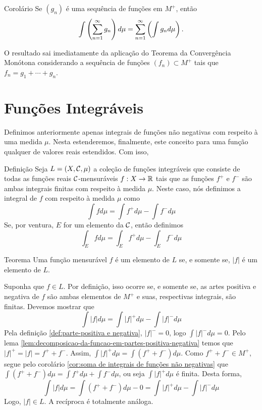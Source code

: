 \begin{env}{Corolário}
	Se $(g_n)$ é uma sequência de funções em $M^+$, então 
	$$
	\int \left(\displaystyle \sum_{n = 1} ^\infty g_n\right)d\mu
	=
	\displaystyle \sum_{n = 1} ^\infty \left(\int g_n d\mu\right).
	$$
\end{env}
\begin{prova}
	O resultado sai imediatamente da aplicação do Teorema da Convergência Monótona considerando a sequência de funções $(f_n) \subset M^+$ tais que
	$f_n = g_1 + \cdots + g_n  $.
\end{prova}
\section{Funções Integráveis}
Definimos anteriormente apenas integrais de funções não negativas com respeito à uma medida $\mu$.
Nesta estenderemos, finalmente, este conceito para uma função qualquer de valores reais estendidos. Com isso,

\begin{env}{Definição}
	Seja $L = (X, \operatorname{\mathcal{C}}, \mu)$ a coleção de funções integráveis que consiste de todas as funções reais $\operatorname{\mathcal{C}}$-mensuráveis $f:X \to \mathbb{R}$ tais que as funções
	$f^+$ e $f^-$ são ambas integrais finitas com respeito à medida $\mu$.
	Neste caso, nós definimos a integral de $f$ com respeito à medida $\mu$ como
	$$
	\int fd\mu
	= \int f^+ d\mu - \int f^- d\mu
	$$
	Se, por ventura, $E$ for um elemento da \sigal $\operatorname{\mathcal{C}}$, então definimos
	$$
	\int_E fd\mu
	= \int_E f^+ d\mu - \int_E f^- d\mu
	$$
\end{env}

\begin{env}{Teorema}
	\label{teo:f é integrável se, só, se |f| o é}
	Uma função mensurável $f$ é um elemento de $L$ se, e somente se, $|f|$ é um elemento de $L$.
\end{env}

\begin{prova}
	Suponha que $f \in L$.
	Por definição, isso ocorre se, e somente se, as artes positiva e negativa de $f$ são ambas elementos de $M^+$ e suas, respectivas integrais, são finitas.
	Devemos mostrar que 
	$$
		\int |f| d\mu = \int |f|^+ d\mu - \int |f|^-d\mu
	$$
	Pela definição \ref{def:parte-positiva e negativa}, $|f|^- = 0$, logo 
	$\int |f|^- d\mu = 0$.
	Pelo lema \ref{lem:decomposicao-da-funcao-em-partes-positiva-negativa} temos que
	$|f|^+ = |f| = f^+ + f^-$.
	Assim, $\displaystyle \int |f|^+ d\mu = \int (f^+ + f^-)d\mu$.
	Como $f^+ + f^- \in M^+$, segue pelo corolário \ref{cor:soma de integrais de funções não negativas} que 
	$\displaystyle\int (f^+ + f^-)d\mu = \int f^+ d\mu + \int f^- d\mu$, ou seja $\displaystyle\int |f|^+d\mu$ é finita.
	Desta forma, 
	$$
	\int |f| d\mu 
	= \int (f^+ + f^-)d\mu - 0 
	= \int |f|^+ d\mu - \int |f|^- d\mu
	$$
	Logo, $|f| \in L$.
	A recíproca é totalmente análoga.	
\end{prova}

